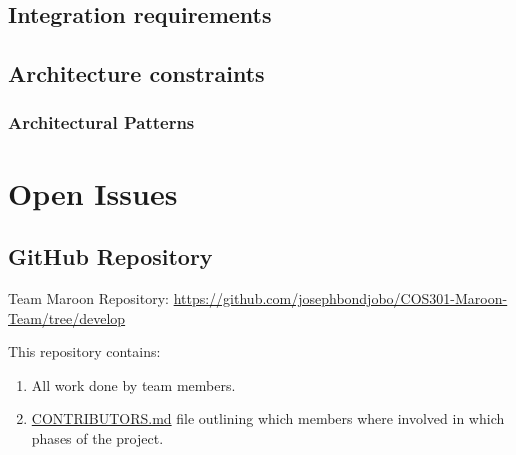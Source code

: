 \documentclass[a4paper,10pt]{article}
\begin{document}
\subsection{Integration requirements}

\subsection{Architecture constraints}

\subsubsection{Architectural Patterns}

\clearpage
\section{Open Issues}
\subsection {GitHub Repository}
Team Maroon Repository: \url{https://github.com/josephbondjobo/COS301-Maroon-Team/tree/develop}

This repository contains:
\begin{enumerate}
\item All work done by team members.
\item \href{https://github.com/josephbondjobo/COS301-Maroon-Team/blob/develop/Intro/Contributors.md}{CONTRIBUTORS.md} file outlining which members where involved in which phases of the project.
\end{enumerate}



\newpage
\clearpage
{}
\end{document}
